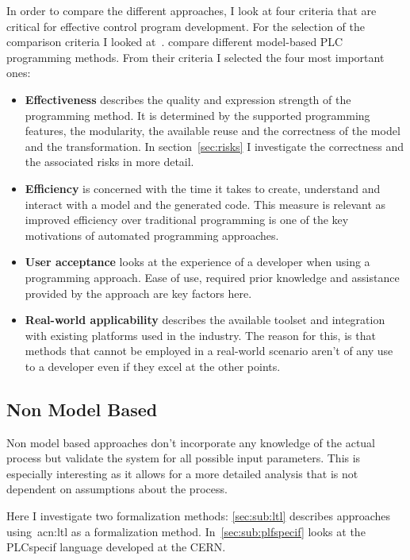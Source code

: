 In order to compare the different approaches, I look at four criteria that are critical for effective control program development.
For the selection of the comparison criteria I looked at~\cite{VH:2014}.
\citeauthor{VH:2014} compare different model-based PLC programming methods.
From their criteria I selected the four most important ones:
\begin{itemize}
	\item \textbf{Effectiveness} describes the quality and expression strength of the programming method.
	It is determined by the supported programming features, the modularity, the available reuse and the correctness of the model and the transformation.
	In section~\ref{sec:risks} I investigate the correctness and the associated risks in more detail.
	\item \textbf{Efficiency} is concerned with the time it takes to create, understand and interact with a model and the generated code.
	This measure is relevant as improved efficiency over traditional programming is one of the key motivations of automated programming approaches.
	\item \textbf{User acceptance} looks at the experience of a developer when using a programming approach.
	Ease of use, required prior knowledge and assistance provided by the approach are key factors here.
	\item \textbf{Real-world applicability} describes the available toolset and integration with existing platforms used in the industry.
	The reason for this, is that methods that cannot be employed in a real-world scenario aren't of any use to a developer even if they excel at the other points.
\end{itemize}

\subsection{Non Model Based}
\label{sec:non_model}

Non model based approaches don't incorporate any knowledge of the actual process but validate the system for all possible input parameters.
This is especially interesting as it allows for a more detailed analysis that is not dependent on assumptions about the process.

Here I investigate two formalization methods:
\ref{sec:sub:ltl} describes approaches using~\acrlong{acn:ltl} as a formalization method.
In~\ref{sec:sub:plfspecif} looks at the PLCspecif language developed at the CERN.


